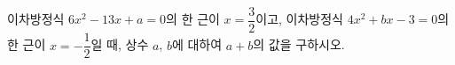 이차방정식 $6x^2-13x+a=0$의 한 근이 $x=\dfrac{3}{2}$이고, 이차방정식 $4x^2+bx-3=0$의 한 근이 $x=-\dfrac{1}{2}$일 때, 상수 $a$, $b$에 대하여 $a+b$의 값을 구하시오.
